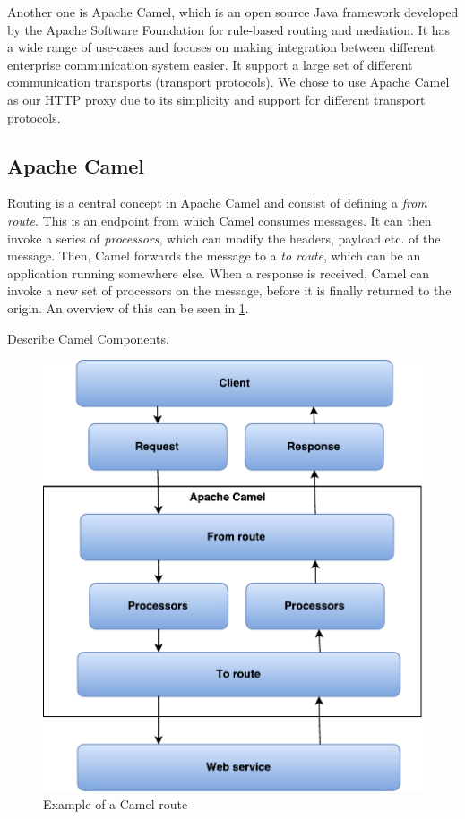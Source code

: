 Another one is Apache Camel, which is an open source Java framework developed by
the Apache Software Foundation for rule-based routing and
mediation\cite{camel-homepage}. It has a wide range of use-cases and focuses on
making integration between different enterprise communication system easier. It
support a large set of different communication transports (transport protocols).
We chose to use Apache Camel as our HTTP proxy due to its simplicity and support
for different transport protocols.

\subsection{Apache Camel}

Routing is a central concept in Apache Camel and consist of defining a
\textit{from route}. This is an endpoint from which Camel consumes messages. It
can then invoke a series of \textit{processors}, which can modify the headers,
payload etc. of the message. Then, Camel forwards the message to a \textit{to
route}, which can be an application running somewhere else. When a response is
received, Camel can invoke a new set of processors on the message, before it is
finally returned to the origin. An overview of this can be seen in
\cref{figure:camel-route}.

Describe Camel Components.

\begin{figure}[h]
\centering
\includegraphics[scale=0.7]{images/camel_routes.pdf}
\caption{Example of a Camel route}
\label{figure:camel-route}
\end{figure}


